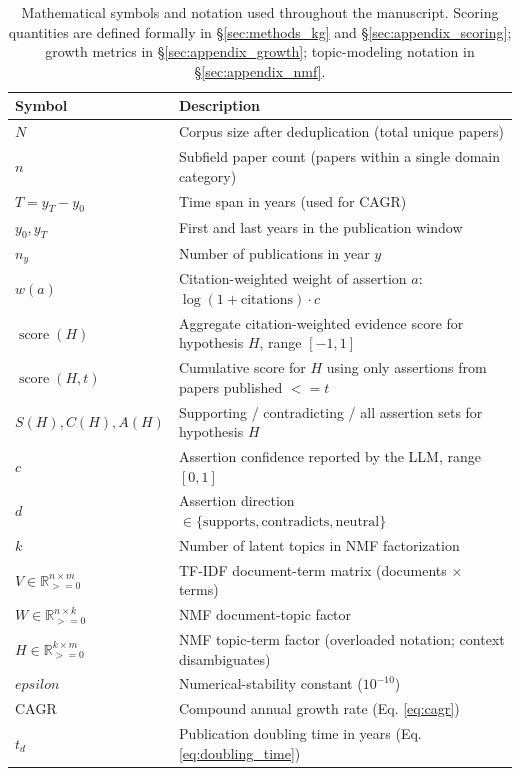 \documentclass[
  english,
]{article}
\newcommand{\score}{\operatorname{score}}
\begin{document}
\begin{table}[H]
\centering
\caption{Mathematical symbols and notation used throughout the manuscript. Scoring quantities are defined formally in \S\ref{sec:methods_kg} and \S\ref{sec:appendix_scoring}; growth metrics in \S\ref{sec:appendix_growth}; topic-modeling notation in \S\ref{sec:appendix_nmf}.}
\label{tab:notation_symbols}
\begin{tabular}{ll}
\toprule
\textbf{Symbol} & \textbf{Description} \\
\midrule
$N$ & Corpus size after deduplication (total unique papers) \\
$n$ & Subfield paper count (papers within a single domain category) \\
$T = y_T - y_0$ & Time span in years (used for CAGR) \\
$y_0, y_T$ & First and last years in the publication window \\
$n_y$ & Number of publications in year $y$ \\
$w(a)$ & Citation-weighted weight of assertion $a$: $\log(1 + \text{citations}) \cdot c$ \\
$\score(H)$ & Aggregate citation-weighted evidence score for hypothesis $H$, range $[-1, 1]$ \\
$\score(H, t)$ & Cumulative score for $H$ using only assertions from papers published $<= t$ \\
$S(H), C(H), A(H)$ & Supporting / contradicting / all assertion sets for hypothesis $H$ \\
$c$ & Assertion confidence reported by the LLM, range $[0, 1]$ \\
$d$ & Assertion direction $\in \{\text{supports}, \text{contradicts}, \text{neutral}\}$ \\
$k$ & Number of latent topics in NMF factorization \\
$V \in \mathbb{R}^{n \times m}_{>= 0}$ & TF-IDF document-term matrix (documents $\times$ terms) \\
$W \in \mathbb{R}^{n \times k}_{>= 0}$ & NMF document-topic factor \\
$H \in \mathbb{R}^{k \times m}_{>= 0}$ & NMF topic-term factor (overloaded notation; context disambiguates) \\
$epsilon$ & Numerical-stability constant ($10^{-\!10}$) \\
$\text{CAGR}$ & Compound annual growth rate (Eq. \ref{eq:cagr}) \\
$t_d$ & Publication doubling time in years (Eq. \ref{eq:doubling_time}) \\

\end{tabular}
\end{table}
\end{document}
